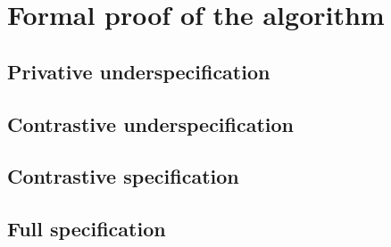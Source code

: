 \documentclass[11pt, oneside]{article}   	%
\begin{document}
\appendix

\section{Formal proof of the algorithm}

\subsection{Privative underspecification}

\subsection{Contrastive underspecification}

\subsection{Contrastive specification}

\subsection{Full specification}
\end{document}
